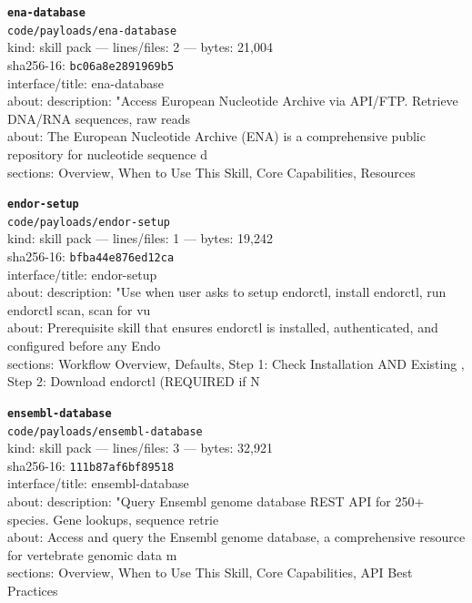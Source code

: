 \noindent\textbf{\texttt{ena-database}}\\
\texttt{code/payloads/ena-database}\\
kind: skill pack --- lines/files: 2 --- bytes: 21,004\\
sha256-16: \texttt{bc06a8e2891969b5}\\
interface/title: ena-database\\
about: description: "Access European Nucleotide Archive via API/FTP. Retrieve DNA/RNA sequences, raw reads \\
about: The European Nucleotide Archive (ENA) is a comprehensive public repository for nucleotide sequence d\\
sections: Overview, When to Use This Skill, Core Capabilities, Resources\\
\vspace*{6.0pt}

\noindent\textbf{\texttt{endor-setup}}\\
\texttt{code/payloads/endor-setup}\\
kind: skill pack --- lines/files: 1 --- bytes: 19,242\\
sha256-16: \texttt{bfba44e876ed12ca}\\
interface/title: endor-setup\\
about: description: "Use when user asks to setup endorctl, install endorctl, run endorctl scan, scan for vu\\
about: Prerequisite skill that ensures endorctl is installed, authenticated, and configured before any Endo\\
sections: Workflow Overview, Defaults, Step 1: Check Installation AND Existing , Step 2: Download endorctl (REQUIRED if N\\
\vspace*{6.0pt}

\noindent\textbf{\texttt{ensembl-database}}\\
\texttt{code/payloads/ensembl-database}\\
kind: skill pack --- lines/files: 3 --- bytes: 32,921\\
sha256-16: \texttt{111b87af6bf89518}\\
interface/title: ensembl-database\\
about: description: "Query Ensembl genome database REST API for 250+ species. Gene lookups, sequence retrie\\
about: Access and query the Ensembl genome database, a comprehensive resource for vertebrate genomic data m\\
sections: Overview, When to Use This Skill, Core Capabilities, API Best Practices\\
\vspace*{6.0pt}

